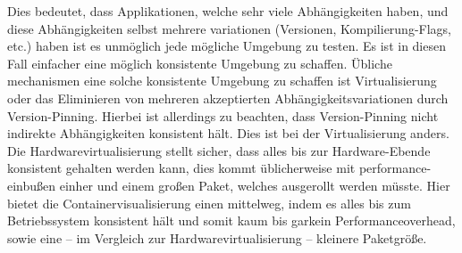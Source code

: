 Dies bedeutet, dass Applikationen, welche sehr viele Abhängigkeiten haben, und diese Abhängigkeiten selbst mehrere variationen (Versionen, Kompilierung-Flags, etc.) haben ist es unmöglich jede mögliche Umgebung zu testen. Es ist in diesen Fall einfacher eine möglich konsistente Umgebung zu schaffen. Übliche mechanismen eine solche konsistente Umgebung zu schaffen ist Virtualisierung oder das Eliminieren von mehreren akzeptierten Abhängigkeitsvariationen durch Version-Pinning. Hierbei ist allerdings zu beachten, dass Version-Pinning nicht indirekte Abhängigkeiten konsistent hält. Dies ist bei der Virtualisierung anders. Die Hardwarevirtualisierung stellt sicher, dass alles bis zur Hardware-Ebende konsistent gehalten werden kann, dies kommt üblicherweise mit performance-einbußen einher und einem großen Paket, welches ausgerollt werden müsste. Hier bietet die Containervisualisierung einen mittelweg, indem es alles bis zum Betriebssystem konsistent hält und somit kaum bis garkein Performanceoverhead, sowie eine – im Vergleich zur Hardwarevirtualisierung – kleinere Paketgröße.
